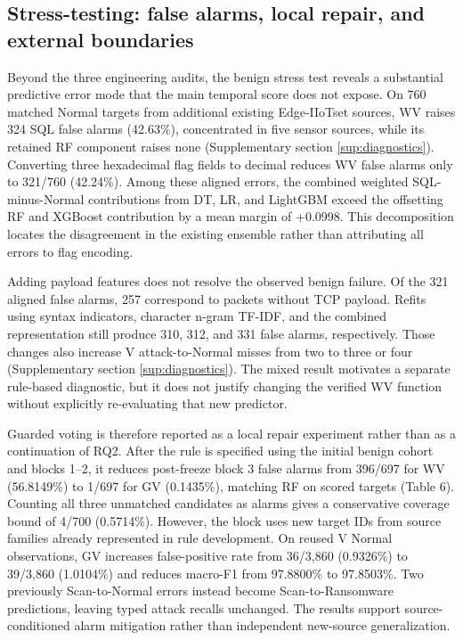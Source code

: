 \documentclass[final,3p,10pt,nopreprintline]{elsarticle}
\begin{document}
\subsection{Stress-testing: false alarms, local repair, and external boundaries}

Beyond the three engineering audits, the benign stress test reveals a substantial predictive error mode that the main temporal score does not expose. On 760 matched Normal targets from additional existing Edge-IIoTset sources, WV raises 324 SQL false alarms (42.63\%), concentrated in five sensor sources, while its retained RF component raises none (Supplementary section \ref*{sup:diagnostics}). Converting three hexadecimal flag fields to decimal reduces WV false alarms only to 321/760 (42.24\%). Among these aligned errors, the combined weighted SQL-minus-Normal contributions from DT, LR, and LightGBM exceed the offsetting RF and XGBoost contribution by a mean margin of +0.0998. This decomposition locates the disagreement in the existing ensemble rather than attributing all errors to flag encoding.

Adding payload features does not resolve the observed benign failure. Of the 321 aligned false alarms, 257 correspond to packets without TCP payload. Refits using syntax indicators, character n-gram TF-IDF, and the combined representation still produce 310, 312, and 331 false alarms, respectively. Those changes also increase V attack-to-Normal misses from two to three or four (Supplementary section \ref*{sup:diagnostics}). The mixed result motivates a separate rule-based diagnostic, but it does not justify changing the verified WV function without explicitly re-evaluating that new predictor.

Guarded voting is therefore reported as a local repair experiment rather than as a continuation of RQ2. After the rule is specified using the initial benign cohort and blocks 1--2, it reduces post-freeze block 3 false alarms from 396/697 for WV (56.8149\%) to 1/697 for GV (0.1435\%), matching RF on scored targets (Table 6). Counting all three unmatched candidates as alarms gives a conservative coverage bound of 4/700 (0.5714\%). However, the block uses new target IDs from source families already represented in rule development. On reused V Normal observations, GV increases false-positive rate from 36/3,860 (0.9326\%) to 39/3,860 (1.0104\%) and reduces macro-F1 from 97.8800\% to 97.8503\%. Two previously Scan-to-Normal errors instead become Scan-to-Ransomware predictions, leaving typed attack recalls unchanged. The results support source-conditioned alarm mitigation rather than independent new-source generalization.
\end{document}
